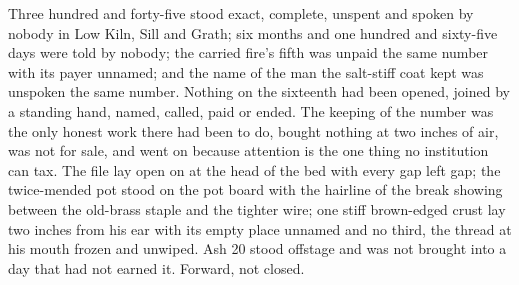 Three hundred and forty-five stood exact, complete, unspent and spoken by nobody in Low Kiln, Sill and Grath; six months and one hundred and sixty-five days were told by nobody; the carried fire's fifth was unpaid the same number with its payer unnamed; and the name of the man the salt-stiff coat kept was unspoken the same number. Nothing on the sixteenth had been opened, joined by a standing hand, named, called, paid or ended. The keeping of the number was the only honest work there had been to do, bought nothing at two inches of air, was not for sale, and went on because attention is the one thing no institution can tax. The file lay open on  at the head of the bed with every gap left gap; the twice-mended pot stood on the pot board with the hairline of the break showing between the old-brass staple and the tighter wire; one stiff brown-edged crust lay two inches from his ear with its empty place unnamed and no third, the thread at his mouth frozen and unwiped. Ash 20 stood offstage and was not brought into a day that had not earned it. Forward, not closed.
